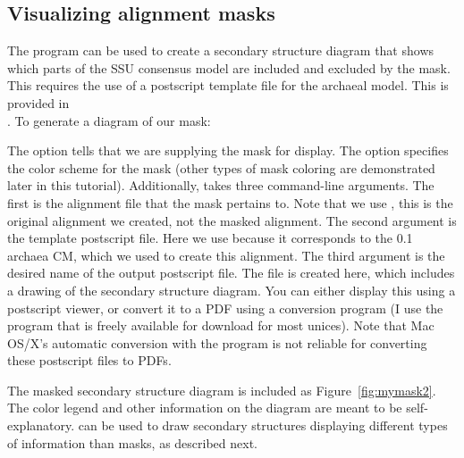 

\subsection{Visualizing alignment masks}

The  program can be used to create a secondary
structure diagram that shows which parts of the SSU consensus model
are included and excluded by the mask. This requires the use of a
postscript template file for the archaeal model. This is provided in 
\\ . 
To generate a diagram of our mask:


The  option tells  that we are
supplying the mask  for display. The 
option specifies the color scheme for the mask (other types of mask
coloring are demonstrated later in this tutorial). Additionally, 
 takes three command-line arguments. The first is
the alignment file that the mask pertains to. Note that we use
, this is the original alignment we created,
not the masked alignment. The second argument is the template
postscript file. Here we use  because it corresponds
to the  0.1 archaea CM, which we used to create this
alignment. The third argument is the desired name of the output
postscript file. The  file is created here, which
includes a drawing of the secondary structure diagram. You can either
display this using a postscript viewer, or convert it to a PDF using a
conversion program (I use the  program that is freely
available for download for most unices). Note that Mac OS/X's
automatic conversion with the  program is not reliable
for converting these postscript files to PDFs.

The masked secondary structure diagram is included as Figure~\ref{fig:mymask2}.
The color legend and other information on the diagram are meant to be
self-explanatory.  can be used to draw secondary
structures displaying different types of information than masks, as
described next.

